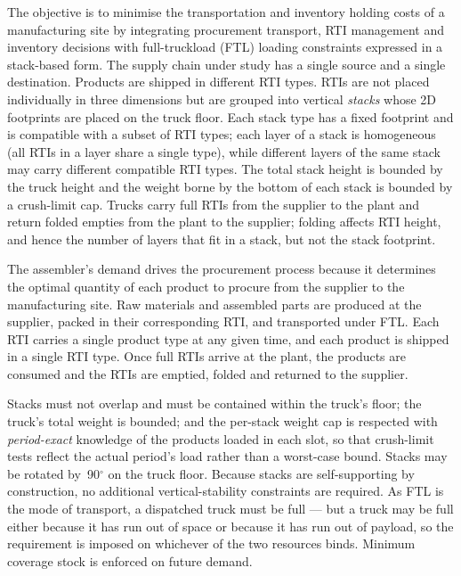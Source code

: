 {The objective is to minimise the transportation and inventory holding
costs of a manufacturing site by integrating procurement transport,
RTI management and inventory decisions with full-truckload (FTL)
loading constraints expressed in a stack-based form. The supply chain
under study has a single source and a single destination. Products are
shipped in different RTI types. RTIs are not placed individually in
three dimensions but are grouped into vertical \emph{stacks} whose
2D footprints are placed on the truck floor. Each stack type has a
fixed footprint and is compatible with a subset of RTI types; each
layer of a stack is homogeneous (all RTIs in a layer share a single
type), while different layers of the same stack may carry different
compatible RTI types. The total stack height is bounded by the truck
height and the weight borne by the bottom of each stack is bounded by
a crush-limit cap. Trucks carry full RTIs from the supplier to the
plant and return folded empties from the plant to the supplier;
folding affects RTI height, and hence the number of layers that fit in
a stack, but not the stack footprint.

The assembler's demand drives the procurement process because it
determines the optimal quantity of each product to procure from the
supplier to the manufacturing site. Raw materials and assembled parts
are produced at the supplier, packed in their corresponding RTI, and
transported under FTL. Each RTI carries a single product type at any
given time, and each product is shipped in a single RTI type. Once
full RTIs arrive at the plant, the products are consumed and the RTIs
are emptied, folded and returned to the supplier.

{\color{blue}
Stacks must not overlap and must be contained within the truck's
floor; the truck's total weight is bounded; and the per-stack weight
cap is respected with \emph{period-exact} knowledge of the products
loaded in each slot, so that crush-limit tests reflect the actual
period's load rather than a worst-case bound. Stacks may be rotated
by~90$^\circ$ on the truck floor. Because stacks are self-supporting
by construction, no additional vertical-stability constraints are
required. As FTL is the mode of transport, a dispatched truck must be full ---
but a truck may be full either because it has run out of space or
because it has run out of payload, so the requirement is imposed on
whichever of the two resources binds.
Minimum coverage stock is enforced on future demand.
}

{\color{blue}
}}
